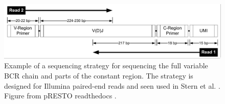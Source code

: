 \begin{figure}
    \centering
    \includegraphics[width=1\textwidth]{figures/Stern2014_ReadConfiguration.pdf}
    \caption{
        \label{fig:UMIread}
        Example of a sequencing strategy for sequencing the full variable BCR chain and parts of the constant region. The strategy is designed for Illumina paired-end reads and seen used in Stern et al. \cite{stern2014b}. Figure from pRESTO readthedocs \cite{vander2014presto}.
    }
\end{figure}

